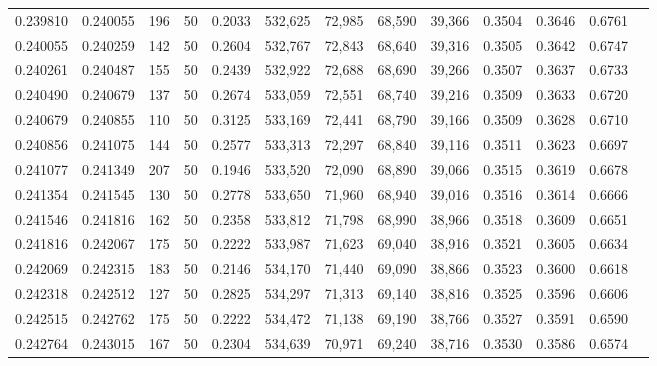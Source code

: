 \begin{tabular}{rrrrrrrrrrrrr}
0.239810 & 0.240055 &   196 &  50 &                                     0.2033 & 532,625 &  72,985 &  68,590 &  39,366 & 0.3504 & 0.3646 & 0.6761 \\
0.240055 & 0.240259 &   142 &  50 &                                     0.2604 & 532,767 &  72,843 &  68,640 &  39,316 & 0.3505 & 0.3642 & 0.6747 \\
0.240261 & 0.240487 &   155 &  50 &                                     0.2439 & 532,922 &  72,688 &  68,690 &  39,266 & 0.3507 & 0.3637 & 0.6733 \\
0.240490 & 0.240679 &   137 &  50 &                                     0.2674 & 533,059 &  72,551 &  68,740 &  39,216 & 0.3509 & 0.3633 & 0.6720 \\
0.240679 & 0.240855 &   110 &  50 &                                     0.3125 & 533,169 &  72,441 &  68,790 &  39,166 & 0.3509 & 0.3628 & 0.6710 \\
0.240856 & 0.241075 &   144 &  50 &                                     0.2577 & 533,313 &  72,297 &  68,840 &  39,116 & 0.3511 & 0.3623 & 0.6697 \\
0.241077 & 0.241349 &   207 &  50 &                                     0.1946 & 533,520 &  72,090 &  68,890 &  39,066 & 0.3515 & 0.3619 & 0.6678 \\
0.241354 & 0.241545 &   130 &  50 &                                     0.2778 & 533,650 &  71,960 &  68,940 &  39,016 & 0.3516 & 0.3614 & 0.6666 \\
0.241546 & 0.241816 &   162 &  50 &                                     0.2358 & 533,812 &  71,798 &  68,990 &  38,966 & 0.3518 & 0.3609 & 0.6651 \\
0.241816 & 0.242067 &   175 &  50 &                                     0.2222 & 533,987 &  71,623 &  69,040 &  38,916 & 0.3521 & 0.3605 & 0.6634 \\
0.242069 & 0.242315 &   183 &  50 &                                     0.2146 & 534,170 &  71,440 &  69,090 &  38,866 & 0.3523 & 0.3600 & 0.6618 \\
0.242318 & 0.242512 &   127 &  50 &                                     0.2825 & 534,297 &  71,313 &  69,140 &  38,816 & 0.3525 & 0.3596 & 0.6606 \\
0.242515 & 0.242762 &   175 &  50 &                                     0.2222 & 534,472 &  71,138 &  69,190 &  38,766 & 0.3527 & 0.3591 & 0.6590 \\
0.242764 & 0.243015 &   167 &  50 &                                     0.2304 & 534,639 &  70,971 &  69,240 &  38,716 & 0.3530 & 0.3586 & 0.6574 \\

\end{tabular}
